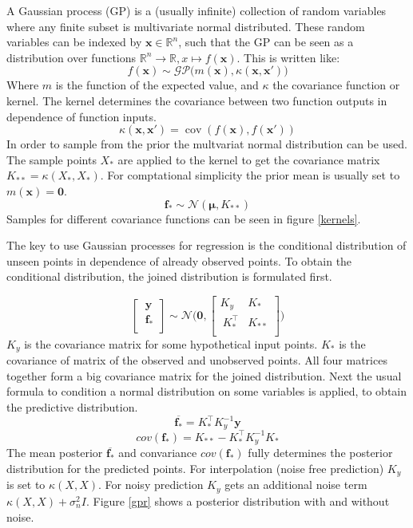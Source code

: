 \documentclass[english]{article}
\begin{document}
A Gaussian process (GP) is a (usually infinite) collection of random variables where any finite subset is multivariate normal distributed. These random variables can be indexed by $\mathbf{x} \in \mathbb{R}^n$, such that the GP can be seen as a distribution over functions $\mathbb{R}^n \rightarrow \mathbb{R}, x \mapsto f(\mathbf{x})$. This is written like:
$$f(\mathbf{x}) \sim \mathcal{GP}\big(m(\mathbf{x}), \kappa(\mathbf{x},\mathbf{x}')\big)$$
Where $m$ is the function of the expected value, and $\kappa$ the covariance function or kernel. The kernel determines the covariance between two function outputs in dependence of function inputs.
$$\kappa(\mathbf{x},\mathbf{x}') = \operatorname{cov}(f(\mathbf{x}),f(\mathbf{x}'))$$
In order to sample from the prior the multvariat normal distribution can be used. The sample points $X_*$ are applied to the kernel to get the covariance matrix $K_{**} = \kappa(X_*,X_*)$. For comptational simplicity the prior mean is usually set to $m(\mathbf{x}) = \mathbf{0}$.
$$\mathbf{f_*} \sim \mathcal{N}(\mathbf{\mathbf{\mu}}, K_{**})$$
Samples for different covariance functions can be seen in figure \ref{kernels}.

The key to use Gaussian processes for regression is the conditional distribution of unseen points in dependence of already observed points.
To obtain the conditional distribution, the joined distribution is formulated first.

$$
\begin{bmatrix}
\ \mathbf{y}\ \\
\ \mathbf{f_*} \\
\end{bmatrix}
\sim \mathcal{N} \Bigg(\mathbf{0},
\begin{bmatrix}
K_y & K_* \\
\ K^{\top}_{*} & K_{**}  \\
\end{bmatrix}
\Bigg)
$$
$K_y$ is the covariance matrix for some hypothetical input points. $K_*$ is the covariance of matrix of the observed and unobserved points. All four matrices together form a big covariance matrix for the joined distribution. Next the usual formula to condition a normal distribution on some variables is applied, to obtain the predictive distribution.
$$\overline{\mathbf{f_*}} = K_*^\top K_y^{-1}\mathbf{y}$$
$$cov(\mathbf{f_*}) = K_{**} - K_*^\top K_y^{-1} K_*$$
The mean posterior $\overline{\mathbf{f_*}}$ and convariance $cov(\mathbf{f_*})$ fully determines the posterior distribution for the predicted points. For interpolation (noise free prediction) $K_y$ is set to  $\kappa(X,X)$. For noisy prediction $K_y$ gets an additional noise term $\kappa(X,X) + \sigma_n^2I$. Figure \ref{gpr} shows a posterior distribution with and without noise.
\end{document}
